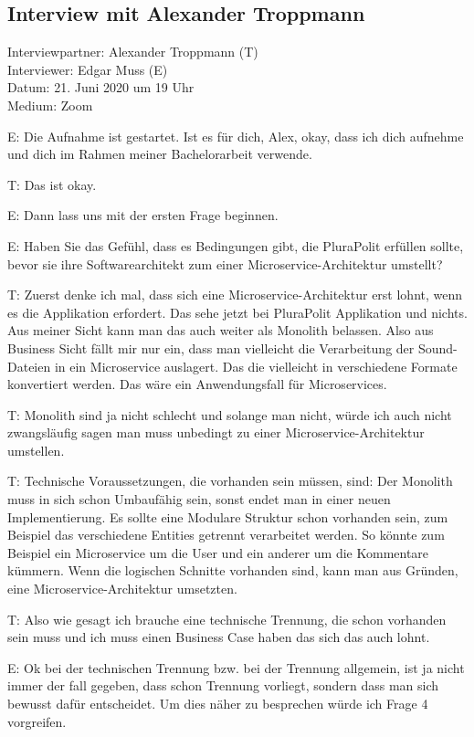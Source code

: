 \subsection{Interview mit Alexander Troppmann}
\label{appendix:troppmann}

Interviewpartner: Alexander Troppmann (T) \\
Interviewer: Edgar Muss (E) \\
Datum: 21. Juni 2020 um 19 Uhr \\
Medium: Zoom

E: Die Aufnahme ist gestartet. Ist es für dich, Alex, okay, dass ich dich aufnehme und dich im Rahmen meiner Bachelorarbeit verwende.

T: Das ist okay.

E: Dann lass uns mit der ersten Frage beginnen.

E: Haben Sie das Gefühl, dass es Bedingungen gibt, die PluraPolit erfüllen sollte, bevor sie ihre Softwarearchitekt zum einer Microservice-Architektur umstellt? 

T: Zuerst denke ich mal, dass sich eine Microservice-Architektur erst lohnt, wenn es die Applikation erfordert. Das sehe jetzt bei PluraPolit Applikation und nichts. Aus meiner Sicht kann man das auch weiter als Monolith belassen.  Also aus Business Sicht fällt mir nur ein,  dass man vielleicht die Verarbeitung der Sound-Dateien in ein Microservice auslagert. Das die vielleicht in verschiedene Formate konvertiert werden. Das wäre ein Anwendungsfall für Microservices. 

T: Monolith sind ja nicht schlecht und solange man nicht, würde ich auch nicht zwangsläufig sagen man muss unbedingt zu einer Microservice-Architektur umstellen.

T: Technische Voraussetzungen, die vorhanden sein müssen, sind: Der Monolith muss in sich schon Umbaufähig sein, sonst endet man in einer neuen Implementierung. Es sollte eine Modulare Struktur schon vorhanden sein, zum Beispiel das verschiedene Entities getrennt verarbeitet werden. So könnte zum Beispiel ein Microservice um die User und ein anderer um  die Kommentare kümmern. Wenn die logischen Schnitte vorhanden sind, kann man aus Gründen, eine Microservice-Architektur umsetzten. 

\label{appendix:t-1} \label{appendix:t-2}
T: Also wie gesagt ich brauche eine technische Trennung, die schon vorhanden sein muss und ich muss einen Business Case haben das sich das auch lohnt.

E: Ok bei der technischen Trennung bzw. bei der Trennung allgemein, ist ja nicht immer der fall gegeben, dass schon Trennung vorliegt, sondern dass man sich bewusst dafür entscheidet. Um dies näher zu besprechen würde ich Frage 4 vorgreifen.

